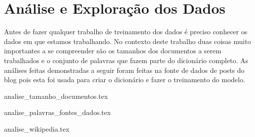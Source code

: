 \section{Análise e Exploração dos Dados}

Antes de fazer qualquer trabalho de treinamento dos dados é preciso conhecer os dados em que estamos trabalhando. No contexto deste trabalho
duas coisas muito importantes a se compreender são os tamanhos dos documentos a serem trabalhados e o conjunto de palavras que fazem
parte do dicionário completo. As análises feitas demonstradas a seguir foram feitas na fonte de dados de posts do blog pois esta foi 
usada para criar o dicionário e fazer o treinamento do modelo.

{analise_tamanho_documentos.tex}

{analise_palavras_fontes_dados.tex}

{analise_wikipedia.tex}
